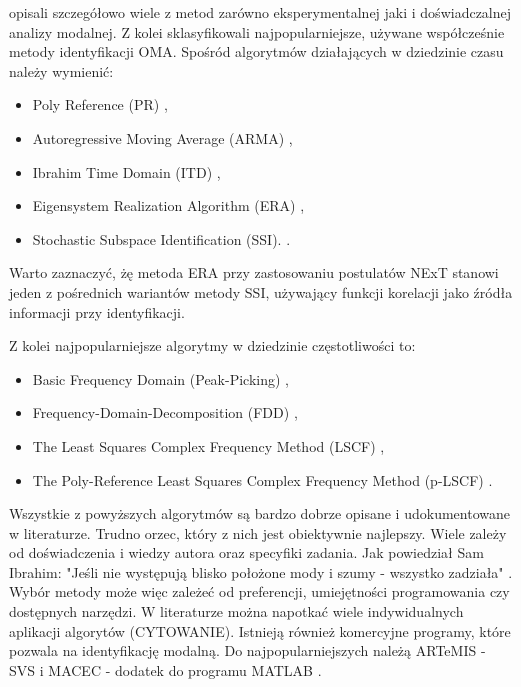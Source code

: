\cite{Maia1997} opisali szczegółowo wiele z metod zarówno eksperymentalnej jaki i doświadczalnej analizy modalnej. Z kolei \cite{Brincker2015} sklasyfikowali najpopularniejsze, używane współcześnie metody identyfikacji OMA. Spośród algorytmów działających w dziedzinie czasu należy wymienić:
\begin{itemize}[noitemsep]
	\item Poly Reference (PR) \parencite{Norton2009,Vold1982},
	\item Autoregressive Moving Average (ARMA) \parencite{Shi1987,Huang2000,Giorcelli1994},
	\item Ibrahim Time Domain (ITD) \parencite{Ibrahim1983,Pappa1985a},
	\item Eigensystem Realization Algorithm (ERA) \parencite{Juang1985,Pappa1985,Juang1988},
	\item Stochastic Subspace Identification (SSI). \parencite{VanOverschee1996,Peeters1999a,Peeters2000}. 
\end{itemize}

Warto zaznaczyć, żę metoda ERA przy zastosowaniu postulatów NExT stanowi jeden z pośrednich wariantów metody SSI, używający funkcji korelacji jako źródła informacji przy identyfikacji.

Z kolei najpopularniejsze algorytmy w dziedzinie częstotliwości to:
\begin{itemize}[noitemsep]
	\item Basic Frequency Domain (Peak-Picking) \parencite{Felber1994},
	\item Frequency-Domain-Decomposition (FDD) \parencite{Brincker2000,Brincker2001a,Brincker2001b},
	\item The Least Squares Complex Frequency Method (LSCF) \parencite{Verboven2005},
	\item The Poly-Reference Least Squares Complex Frequency Method (p-LSCF) \parencite{Peeters2005}.
\end{itemize}



Wszystkie z powyższych algorytmów są bardzo dobrze opisane i udokumentowane w literaturze. Trudno orzec, który z nich jest obiektywnie najlepszy. Wiele zależy od doświadczenia i wiedzy autora oraz specyfiki zadania. Jak powiedział Sam Ibrahim: "Jeśli nie występują blisko położone mody i szumy - wszystko zadziała" . Wybór metody może więc zależeć od preferencji, umiejętności programowania czy dostępnych narzędzi. W literaturze można napotkać wiele indywidualnych aplikacji algorytów (CYTOWANIE). Istnieją również komercyjne programy, które pozwala na identyfikację modalną. Do najpopularniejszych należą ARTeMIS - SVS \parencite{Extractor1999} i MACEC - dodatek do programu MATLAB \parencite{Reynders2014}.

